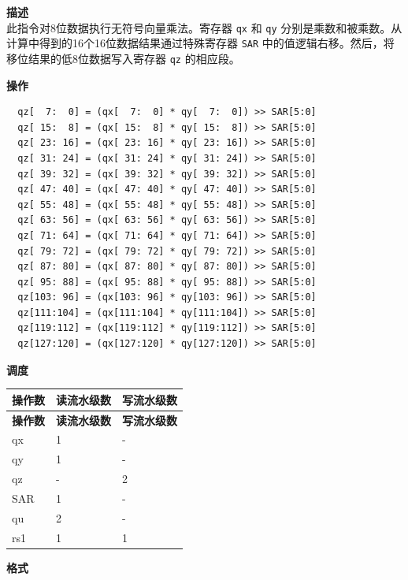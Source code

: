\textbf{描述}\\
此指令对8位数据执行无符号向量乘法。寄存器 \lstinline{qx} 和 \lstinline{qy} 分别是乘数和被乘数。从计算中得到的16个16位数据结果通过特殊寄存器 \lstinline{SAR} 中的值逻辑右移。然后，将移位结果的低8位数据写入寄存器 \lstinline{qz} 的相应段。

\textbf{操作}\\
\begin{lstlisting}
  qz[  7:  0] = (qx[  7:  0] * qy[  7:  0]) >> SAR[5:0]
  qz[ 15:  8] = (qx[ 15:  8] * qy[ 15:  8]) >> SAR[5:0]
  qz[ 23: 16] = (qx[ 23: 16] * qy[ 23: 16]) >> SAR[5:0]
  qz[ 31: 24] = (qx[ 31: 24] * qy[ 31: 24]) >> SAR[5:0]
  qz[ 39: 32] = (qx[ 39: 32] * qy[ 39: 32]) >> SAR[5:0]
  qz[ 47: 40] = (qx[ 47: 40] * qy[ 47: 40]) >> SAR[5:0]
  qz[ 55: 48] = (qx[ 55: 48] * qy[ 55: 48]) >> SAR[5:0]
  qz[ 63: 56] = (qx[ 63: 56] * qy[ 63: 56]) >> SAR[5:0]
  qz[ 71: 64] = (qx[ 71: 64] * qy[ 71: 64]) >> SAR[5:0]
  qz[ 79: 72] = (qx[ 79: 72] * qy[ 79: 72]) >> SAR[5:0]
  qz[ 87: 80] = (qx[ 87: 80] * qy[ 87: 80]) >> SAR[5:0]
  qz[ 95: 88] = (qx[ 95: 88] * qy[ 95: 88]) >> SAR[5:0]
  qz[103: 96] = (qx[103: 96] * qy[103: 96]) >> SAR[5:0]
  qz[111:104] = (qx[111:104] * qy[111:104]) >> SAR[5:0]
  qz[119:112] = (qx[119:112] * qy[119:112]) >> SAR[5:0]
  qz[127:120] = (qx[127:120] * qy[127:120]) >> SAR[5:0]
\end{lstlisting}


\textbf{调度}\\
\begin{longtable}[c]{|l|l|l|}
    \hline
    \rowcolor{lightgray}
    \textbf{操作数} & \textbf{读流水级数} & \textbf{写流水级数} \\\hline
    \endfirsthead
    \hline
    \rowcolor{lightgray}
     \textbf{操作数} & \textbf{读流水级数} & \textbf{写流水级数} \\\hline
    \endhead
    \hline
    \endfoot

    qx & 1 & - \\\hline
  qy & 1 & - \\\hline
     qz & - & 2 \\\hline
    SAR & 1 & - \\\hline
    qu & 2 & - \\\hline
    rs1 & 1 & 1

\end{longtable}

\textbf{格式}\\

